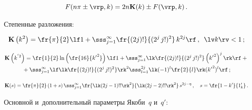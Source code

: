 {\begin{equation*}
F(n\pi \pm \vrp,k) = 2n \bK(k)\pm F(\vrp,k)\,.


\end{equation*}



Степенные разложения:

\begin{equation*}

\bK \left(k^2\right) = \fr{\pi}{2} \lf 1 + 

\sss_{j=1}^\infty \fr{(2j)!}{(2^j\, j!)^2}\, k^{2j}\rf\,,\enskip 

\lv k \rv<1\,;


\end{equation*}



\vspace*{-12pt}



\noindent

\begin{multline*}

\bK\left(k^{'2}\right) = \fr{1}{2} \ln \left(\fr{16}{{k'}^2}\right)\lf 1+ 

\sss_{j=1}^\infty \lk \fr{(2j)!}{(2^j\, j!)^2} \left({k'}^2\right)^j \rk\rf+{}\\

{}+ \sss_{j=1}^\infty\lf \lk \fr{(2j)!}{(2^j\, j!)^2}\rk^2 

\sss_{l=1}^{2j} \lk (-1)^l \fr{2}{l}\rk({k'}^2)^l\rf\,;


\end{multline*}



\noindent

\begin{equation*}

\bK (s) =\fr{\pi}{2}\left(1+s\right) \sss_{j=1}^\infty 

\fr{\lk(2j-1)!!\rk^2}{\lk(2j-2)!!\rk^2}\, s^{2j-\eta}\,,\quad 

s=\fr{1-k'}{1_k'}\,.


\end{equation*}



Основной и~дополнительный параметры Якоби~$q$ и~$q'$:

  \begin{equation*}


\end{equation*}}
